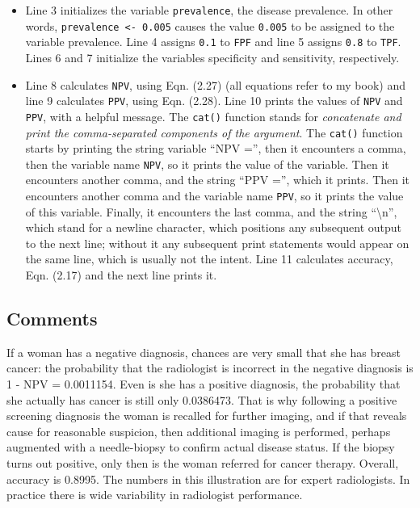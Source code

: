 \documentclass[
]{book}
\begin{document}
\begin{itemize}
\item
  Line 3 initializes the variable \texttt{prevalence}, the disease prevalence. In other words, \texttt{prevalence\ \textless{}-\ 0.005} causes the value \texttt{0.005} to be assigned to the variable prevalence. Line 4 assigns \texttt{0.1} to \texttt{FPF} and line 5 assigns \texttt{0.8} to \texttt{TPF}. Lines 6 and 7 initialize the variables specificity and sensitivity, respectively.
\item
  Line 8 calculates \texttt{NPV}, using Eqn. (2.27) (all equations refer to my book) and line 9 calculates \texttt{PPV}, using Eqn. (2.28). Line 10 prints the values of \texttt{NPV} and \texttt{PPV}, with a helpful message. The \texttt{cat()} function stands for \emph{concatenate and print the comma-separated components of the argument}. The \texttt{cat()} function starts by printing the string variable ``NPV ='', then it encounters a comma, then the variable name \texttt{NPV}, so it prints the value of the variable. Then it encounters another comma, and the string ``PPV ='', which it prints. Then it encounters another comma and the variable name \texttt{PPV}, so it prints the value of this variable. Finally, it encounters the last comma, and the string ``\textbackslash n'', which stand for a newline character, which positions any subsequent output to the next line; without it any subsequent print statements would appear on the same line, which is usually not the intent. Line 11 calculates accuracy, Eqn. (2.17) and the next line prints it.
\end{itemize}

\hypertarget{binaryTask0NpvPpvComments}{%
\subsection{Comments}\label{binaryTask0NpvPpvComments}}

If a woman has a negative diagnosis, chances are very small that she has breast cancer: the probability that the radiologist is incorrect in the negative diagnosis is 1 - NPV = 0.0011154. Even is she has a positive diagnosis, the probability that she actually has cancer is still only 0.0386473. That is why following a positive screening diagnosis the woman is recalled for further imaging, and if that reveals cause for reasonable suspicion, then additional imaging is performed, perhaps augmented with a needle-biopsy to confirm actual disease status. If the biopsy turns out positive, only then is the woman referred for cancer therapy. Overall, accuracy is 0.8995. The numbers in this illustration are for expert radiologists. In practice there is wide variability in radiologist performance.
\end{document}
